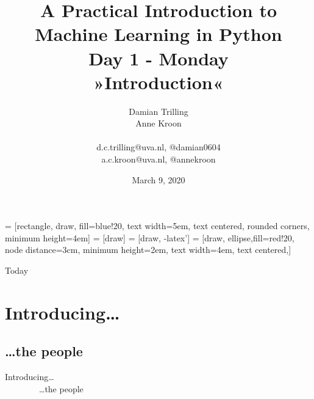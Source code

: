\documentclass{beamer}
\begin{document}
\title[Big Data and Automated Content Analysis]{\textbf{A Practical Introduction to Machine Learning in Python} \\Day 1 - Monday \\ »Introduction«}
\author[Damian Trilling, Anne Kroon]{Damian Trilling \\ Anne Kroon \\ ~ \\ \footnotesize{d.c.trilling@uva.nl, @damian0604 \\a.c.kroon@uva.nl, @annekroon} \\}
\date{March 9, 2020}


 = [rectangle, draw, fill=blue!20, 
text width=5em, text centered, rounded corners, minimum height=4em]
 = [draw]
 = [draw, -latex']
 = [draw, ellipse,fill=red!20, node distance=3cm,
minimum height=2em, text width=4em, text centered,]



\begin{frame}{}
\titlepage
\end{frame}

\begin{frame}{Today}
\tableofcontents
\end{frame}

\section{Introducing\ldots}
\subsection{\ldots the people}

\begin{frame} 
Introducing\ldots \\
~~~~~~~~\ldots the people
\end{frame}
\end{document}
